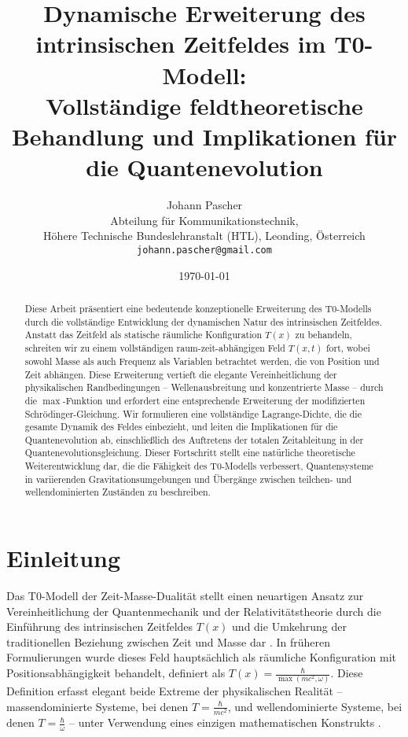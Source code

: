 \documentclass[12pt,a4paper]{article}
\newcommand{\Tfield}{T(x)}
\newcommand{\Tfieldt}{T(x,t)}
\begin{document}
	
	\title{Dynamische Erweiterung des intrinsischen Zeitfeldes im T0-Modell: \\Vollständige feldtheoretische Behandlung und Implikationen für die Quantenevolution}
	\author{Johann Pascher\\
		Abteilung für Kommunikationstechnik, \\Höhere Technische Bundeslehranstalt (HTL), Leonding, Österreich\\
		\texttt{johann.pascher@gmail.com}}
	\date{\today}
	
	\maketitle
	
	\begin{abstract}
		Diese Arbeit präsentiert eine bedeutende konzeptionelle Erweiterung des T0-Modells durch die vollständige Entwicklung der dynamischen Natur des intrinsischen Zeitfeldes. Anstatt das Zeitfeld als statische räumliche Konfiguration $\Tfield$ zu behandeln, schreiten wir zu einem vollständigen raum-zeit-abhängigen Feld $\Tfieldt$ fort, wobei sowohl Masse als auch Frequenz als Variablen betrachtet werden, die von Position und Zeit abhängen. Diese Erweiterung vertieft die elegante Vereinheitlichung der physikalischen Randbedingungen – Wellenausbreitung und konzentrierte Masse – durch die $\max$-Funktion und erfordert eine entsprechende Erweiterung der modifizierten Schrödinger-Gleichung. Wir formulieren eine vollständige Lagrange-Dichte, die die gesamte Dynamik des Feldes einbezieht, und leiten die Implikationen für die Quantenevolution ab, einschließlich des Auftretens der totalen Zeitableitung in der Quantenevolutionsgleichung. Dieser Fortschritt stellt eine natürliche theoretische Weiterentwicklung dar, die die Fähigkeit des T0-Modells verbessert, Quantensysteme in variierenden Gravitationsumgebungen und Übergänge zwischen teilchen- und wellendominierten Zuständen zu beschreiben.
	\end{abstract}
	\newpage
	\tableofcontents
	\newpage
	\section{Einleitung}
	\label{sec:introduction}
	
	Das T0-Modell der Zeit-Masse-Dualität stellt einen neuartigen Ansatz zur Vereinheitlichung der Quantenmechanik und der Relativitätstheorie durch die Einführung des intrinsischen Zeitfeldes $\Tfield$ und die Umkehrung der traditionellen Beziehung zwischen Zeit und Masse dar \cite{pascher_part1_2025,pascher_part2_2025}. In früheren Formulierungen wurde dieses Feld hauptsächlich als räumliche Konfiguration mit Positionsabhängigkeit behandelt, definiert als $\Tfield = \frac{\hbar}{\max(mc^2, \omega)}$. Diese Definition erfasst elegant beide Extreme der physikalischen Realität – massendominierte Systeme, bei denen $T = \frac{\hbar}{mc^2}$, und wellendominierte Systeme, bei denen $T = \frac{\hbar}{\omega}$ – unter Verwendung eines einzigen mathematischen Konstrukts \cite{pascher_quantum_2025}.
	
\end{document}
